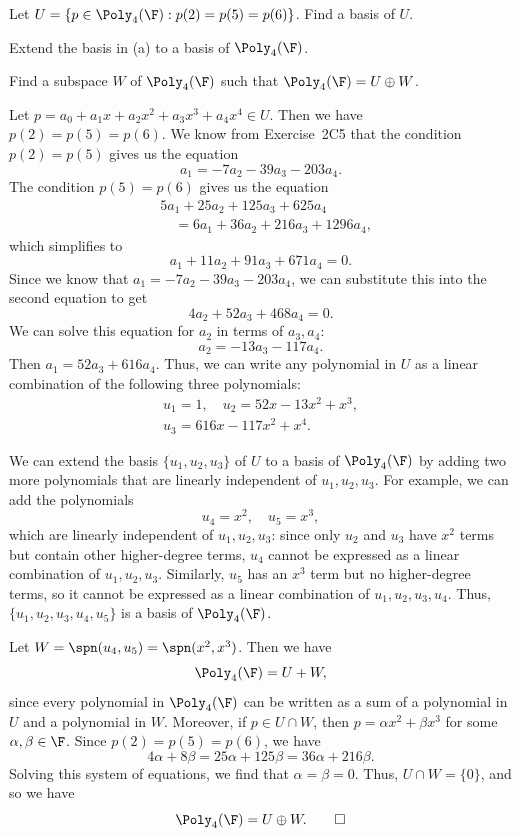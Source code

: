 \begin{exercise}\leavevmode
\begin{parts}
\item Let $U=\{p\in\Poly_4(\F) : p(2)=p(5)=p(6)\}$. Find a basis of $U$.
\item Extend the basis in (a) to a basis of $\Poly_4(\F)$.
\item Find a subspace $W$ of $\Poly_4(\F)$ such that $\Poly_4(\F)=U\oplus W$.
\end{parts}
\end{exercise}
\begin{solution}
\begin{parts}
\item Let $p=a_0+a_1x+a_2x^2+a_3x^3+a_4x^4\in U$. Then we have
  $p(2)=p(5)=p(6)$. We know from Exercise~2C5 that the condition $p(2)=p(5)$
  gives us the equation
  \[ a_1 = -7a_2-39a_3-203a_4. \]
  The condition $p(5)=p(6)$ gives us the equation
  \begin{align*}
  &5a_1+25a_2+125a_3+625a_4\\
  &\quad= 6a_1+36a_2+216a_3+1296a_4,
  \end{align*}
  which simplifies to
  \[ a_1+11a_2+91a_3+671a_4 = 0. \]
  Since we know that $a_1=-7a_2-39a_3-203a_4$, we can substitute this into the
  second equation to get
  \[ 4a_2+52a_3+468a_4 = 0. \]
  We can solve this equation for $a_2$ in terms of $a_3,a_4$:
  \[ a_2 = -13a_3-117a_4. \]
  Then $a_1=52a_3+616a_4$. Thus, we can write any polynomial in $U$ as a linear
  combination of the following three polynomials:
  \begin{gather*}
  u_1=1, \quad u_2=52x-13x^2+x^3,\\
  u_3=616x-117x^2+x^4.
  \end{gather*}
\item We can extend the basis $\{u_1,u_2,u_3\}$ of $U$ to a basis of
  $\Poly_4(\F)$ by adding two more polynomials that are linearly independent of
  $u_1,u_2,u_3$. For example, we can add the polynomials
  \[ u_4=x^2, \quad u_5=x^3, \]
  which are linearly independent of $u_1,u_2,u_3$: since only $u_2$ and $u_3$
  have $x^2$ terms but contain other higher-degree terms, $u_4$ cannot be
  expressed as a linear combination of $u_1,u_2,u_3$. Similarly, $u_5$ has an
  $x^3$ term but no higher-degree terms, so it cannot be expressed as a linear
  combination of $u_1,u_2,u_3,u_4$. Thus, $\{u_1,u_2,u_3,u_4,u_5\}$ is a basis
  of $\Poly_4(\F)$.
\item Let $W=\spn(u_4,u_5)=\spn(x^2,x^3)$. Then we have
  \[ \Poly_4(\F) = U+W, \]
  since every polynomial in $\Poly_4(\F)$ can be written as a sum of a
  polynomial in $U$ and a polynomial in $W$. Moreover, if $p\in U\cap W$, then
  $p=\alpha x^2+\beta x^3$ for some $\alpha,\beta\in\F$. Since
  $p(2)=p(5)=p(6)$, we have
  \[ 4\alpha+8\beta = 25\alpha+125\beta = 36\alpha+216\beta. \]
  Solving this system of equations, we find that $\alpha=\beta=0$. Thus,
  $U\cap W=\{0\}$, and so we have
  \[ \Poly_4(\F) = U\oplus W. \qedhere \]
\end{parts}
\end{solution}

